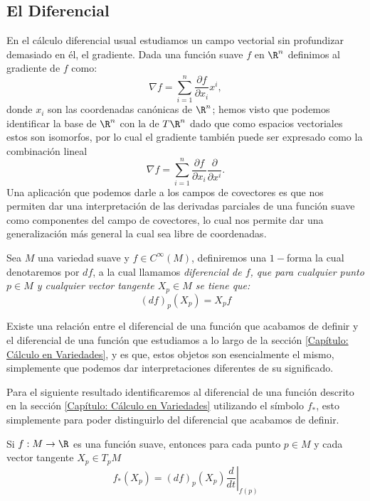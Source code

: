 \subsection{El Diferencial}\label{Subsección: El Diferencial}
En el cálculo diferencial usual estudiamos un campo vectorial sin profundizar demasiado en él, el gradiente. Dada una función suave $f$ en $\R^n$ definimos al gradiente de $f$ como:
\[
	\nabla f = \sum_{i=1}^{n} \frac{\partial f}{\partial x_i} x^i,
\]
donde $x_i$ son las coordenadas canónicas de $\R^n$; hemos visto que podemos identificar la base de $\R^n$ con la de $T\R^n$ dado que como espacios vectoriales estos son isomorfos, por lo cual el gradiente también puede ser expresado como la combinación lineal
\[
	\nabla f = \sum_{i=1}^{n} \frac{\partial f}{\partial x_i} \frac{\partial}{\partial x^i}.
\]
Una aplicación que podemos darle a los campos de covectores es que nos permiten dar una interpretación de las derivadas parciales de una función suave como componentes del campo de covectores, lo cual nos permite dar una generalización más general la cual sea libre de coordenadas.

\begin{definition}
	Sea $M$ una variedad suave y $f \in C^{\infty}(M)$, definiremos una $1-$forma la cual denotaremos por $df$, a la cual llamamos \it{diferencial de $f$}, que para cualquier punto $p \in M$ y cualquier vector tangente $X_p \in M$ se tiene que:
	\[
		(df)_p(X_p) = X_p f
	\]
\end{definition}

Existe una relación entre el diferencial de una función que acabamos de definir y el diferencial de una función que estudiamos a lo largo de la sección \ref{Capítulo: Cálculo en Variedades}, y es que, estos objetos son esencialmente el mismo, simplemente que podemos dar interpretaciones diferentes de su significado.

Para el siguiente resultado identificaremos al diferencial de una función descrito en la sección \ref{Capítulo: Cálculo en Variedades} utilizando el símbolo $f_*$, esto simplemente para poder distinguirlo del diferencial que acabamos de definir.

\begin{theorem}
	Si $f: M \to \R$ es una función suave, entonces para cada punto $p \in M$ y cada vector tangente $X_p \in T_pM$
	\[
		f_*(X_p) = (df)_p (X_p) \left. \frac{d}{dt} \right|_{f(p)}
	\]
\end{theorem}

